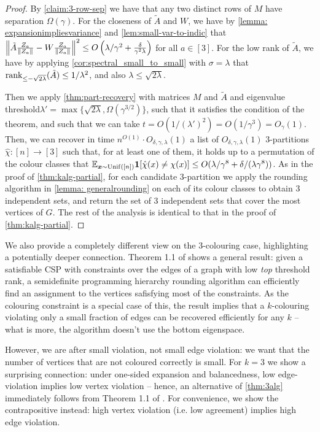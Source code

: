 \begin{proof}
By \cref{claim:3-row-sep} we have that any two distinct rows of $M$ have separation $\Omega(\gamma)$.
For the closeness of $\tilde{A}$ and $W$, we have by \cref{lemma: expansionimpliesvariance} and \cref{lem:small-var-to-indic} that $\left\lVert\tilde{A} \frac{Z_a}{\left\lVert Z_a\right\rVert} - W \frac{Z_a}{\left\lVert Z_a\right\rVert}\right\rVert^2 \leq O\left(\lambda/\gamma^2 + \frac{\delta}{\gamma^2 \lambda}\right)$ for all $a \in [3]$.
For the low rank of $\tilde{A}$, we have by applying \cref{cor:spectral_small_to_small} with $\sigma=\lambda$ that $\operatorname{rank}_{\leq -\sqrt{2\lambda}}(\tilde{A}) \leq 1/\lambda^2$, and also $\lambda \leq \sqrt{2 \lambda}$. 

Then we apply \cref{thm:part-recovery} with matrices $M$ and $\tilde{A}$ and eigenvalue threshold\linebreak $\lambda' = \max\{\sqrt{2 \lambda}, \Omega(\gamma^{3/2})\}$, such that it satisfies the condition of the theorem, and such that we can take $t = O(1/(\lambda')^2) = O(1/\gamma^3) = O_{\gamma}(1)$.
Then, we can recover in time $n^{O(1)} \cdot O_{\delta,\gamma,\lambda}(1)$ a list of $O_{\delta,\gamma,\lambda}(1)$ $3$-partitions $\hat{\chi}: [n] \to [3]$ such that, for at least one of them, it holds up to a permutation of the colour classes that $\mathbb{E}_{\bm{x} \sim \operatorname{Unif}([n])} \mathbf{1}[\hat\chi(x) \neq \chi(x)] \leq O(\lambda/\gamma^8+\delta/(\lambda\gamma^8))$.
As in the proof of \cref{thm:kalg-partial}, for each candidate $3$-partition we apply the rounding algorithm in \cref{lemma: generalrounding} on each of its colour classes to obtain $3$ independent sets, and return the set of $3$ independent sets that cover the most vertices of $G$.
The rest of the analysis is identical to that in the proof of \cref{thm:kalg-partial}.
\end{proof}


We also provide a completely different view on the $3$-colouring case, highlighting a potentially deeper connection. Theorem 1.1 of \cite{barak-raghavendra-steurer} shows a general result: given a satisfiable CSP with constraints over the edges of a graph with low \textit{top} threshold rank, a semidefinite programming hierarchy rounding algorithm can efficiently find an assignment to the vertices safisfying most of the constraints. As the colouring constraint is a special case of this, the result implies that a $k$-colouring violating only a small fraction of edges can be recovered efficiently for any $k$ -- what is more, the algorithm doesn't use the bottom eigenspace.

However, we are after small  violation, not small edge violation: we want that the number of vertices that are not coloured correctly is small. For $k=3$ we show a surprising connection: under one-sided expansion and balancedness, low edge-violation implies low vertex violation -- hence, an alternative of \cref{thm:3alg} immediately follows from Theorem 1.1 of \cite{barak-raghavendra-steurer}. For convenience, we show the contrapositive instead: high vertex violation (i.e. low agreement) implies high edge violation.



